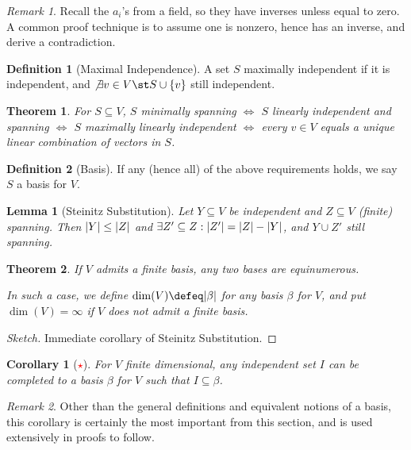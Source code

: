 \documentclass[12pt, oneside]{article}
\theoremstyle{definition}
\newtheorem{defn}{Definition}
\theoremstyle{plain}
\newtheorem{thm}{Theorem}
\newtheorem{cor}{Corollary}
\newtheorem{lemma}{Lemma}
\theoremstyle{remark}
\newtheorem{remark}{Remark}
\begin{document}
\begin{remark}
Recall the $a_i$'s from a field, so they have inverses unless equal to zero. A common proof technique is to assume one is nonzero, hence has an inverse, and derive a contradiction.  
\end{remark}

\begin{defn}[Maximal Independence]
  A set $S$ maximally independent if it is independent, and $\not \exists v \in V \st S \cup \{v\}$ still independent.
\end{defn}

\begin{thm}
  For $S \subseteq V$, $S$ minimally spanning $\iff$ $S$ linearly independent and spanning $\iff$ $S$ maximally linearly independent $\iff$ every $v \in V$ equals a \emph{unique} linear combination of vectors in $S$.
\end{thm}

\begin{defn}[Basis]
  If any (hence all) of the above requirements holds, we say $S$ a basis for $V$.
\end{defn}

\begin{lemma}[Steinitz Substitution]
  Let $Y \subseteq V$ be independent and $Z \subseteq V$ (finite) spanning. Then $\abs{Y} \leq \abs{Z}$ and $\exists Z' \subseteq Z : \abs{Z'} =\abs{Z} - \abs{Y}$, and $Y \cup Z'$ still spanning.
\end{lemma}
\begin{thm}
  If $V$ admits a finite basis, any two bases are equinumerous.
  
  In such a case, we define $\dim(V) \defeq  \abs{\beta}$ for any basis $\beta$ for $V$, and put $\dim(V) = \infty$ if $V$ does not admit a finite basis.
\end{thm}
\begin{proof}[Sketch]
  Immediate corollary of Steinitz Substitution.
\end{proof}

\begin{cor}[\textcolor{red}{$\star$}]
  For $V$ finite dimensional, any independent set $I$ can be completed to a basis $\beta$ for $V$ such that $I \subseteq \beta$.
\end{cor}

\begin{remark}
  Other than the general definitions and equivalent notions of a basis, this corollary is certainly the most important from this section, and is used extensively in proofs to follow.
\end{remark}
\end{document}
